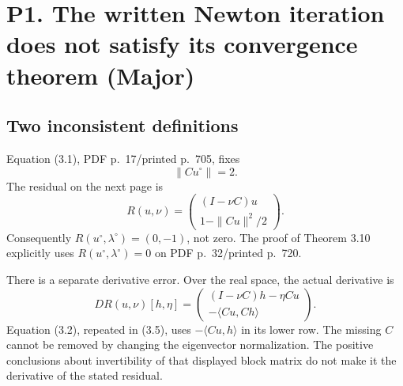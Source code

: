 \documentclass[10pt]{article}
\begin{document}
\section*{P1. The written Newton iteration does not satisfy its convergence theorem (Major)}
\subsection*{Two inconsistent definitions}
Equation (3.1), PDF p. 17/printed p. 705, fixes \[\|Cu^\circ\|=2.\] The residual on the next page is \[R(u,\nu)=
\begin{pmatrix}(I-\nu C)u\\ 1-\|Cu\|^2/2\end{pmatrix}.\] Consequently \(R(u^\circ,\lambda^\circ)=(0,-1)\), not zero. The proof of Theorem 3.10 explicitly uses \(R(u^\circ,\lambda^\circ)=0\) on PDF p. 32/printed p. 720.\par
There is a separate derivative error. Over the real space, the actual derivative is \[DR(u,\nu)[h,\eta]
=\begin{pmatrix}(I-\nu C)h-\eta Cu\\-\langle Cu,Ch\rangle\end{pmatrix}.\] Equation (3.2), repeated in (3.5), uses \(-\langle Cu,h\rangle\) in its lower row. The missing \(C\) cannot be removed by changing the eigenvector normalization. The positive conclusions about invertibility of that displayed block matrix do not make it the derivative of the stated residual.\par
\end{document}
